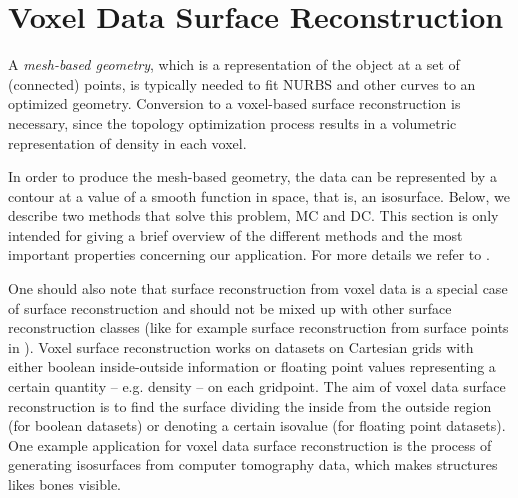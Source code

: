 \section{Voxel Data Surface Reconstruction}
\label{sec:surfaceBackg}
A \emph{mesh-based geometry}, which is a representation of the object at a set of (connected) points, is typically needed to fit \ac{NURBS} and other curves to an optimized geometry. Conversion to a voxel-based surface reconstruction is necessary, since the topology optimization process results in a volumetric representation of density in each voxel.

In order to produce the mesh-based geometry, the data can be represented by a contour at a value of a smooth function in space, that is, an isosurface. Below, we describe two methods that solve this problem, \acl{MC} and \acl{DC}. This section is only intended for giving a brief overview of the different methods and the most important properties concerning our application. For more details we refer to \cite{Marching2006, Hermite2002}. 

One should also note that surface reconstruction from voxel data is a special case of surface reconstruction and should not be mixed up with other surface reconstruction classes (like for example surface reconstruction from surface points in \cite{eck1996automatic}). Voxel surface reconstruction works on datasets on Cartesian grids with either boolean inside-outside information or floating point values representing a certain quantity -- e.g. density -- on each gridpoint. The aim of voxel data surface reconstruction is to find the surface dividing the inside from the outside region (for boolean datasets) or denoting a certain isovalue (for floating point datasets). One example application for voxel data surface reconstruction is the process of generating isosurfaces from computer tomography data, which makes structures likes bones visible.



